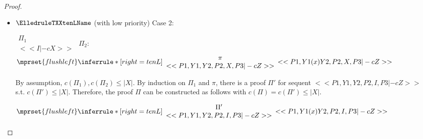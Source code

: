 \begin{proof}
\begin{enumerate}
\begin{itemize}
  \item $\ElledruleTXXtenLName$ (with low priority) Case 2:
      \begin{center}
        \scriptsize
        \begin{math}
          \begin{array}{c}
            \Pi_1 \\
            {<<I |-c X>>}
          \end{array}
        \end{math}
        \qquad\qquad
        $\Pi_2$:
        \begin{math}
          $$\mprset{flushleft}
          \inferrule* [right={\tiny tenL}] {
            {
              \begin{array}{c}
                \pi \\
                {<<P1, Y1, Y2, P2, X, P3 |-c Z>>}
              \end{array}
            }
          }{<<P1, Y1 (x) Y2, P2, X, P3 |-c Z>>}
        \end{math}
      \end{center}
      By assumption, $c(\Pi_1),c(\Pi_2)\leq |X|$. By induction on $\Pi_1$ and $\pi$, there is
      a proof $\Pi'$ for sequent $<<P1, Y1, Y2, P2, I, P3 |-c Z>>$ s.t. $c(\Pi') \leq |X|$.
      Therefore, the proof $\Pi$ can be constructed as follows with
      $c(\Pi) = c(\Pi') \leq |X|$.
      \begin{center}
        \scriptsize
        \begin{math}
          $$\mprset{flushleft}
          \inferrule* [right={\tiny tenL}] {
            {
              \begin{array}{c}
                \Pi' \\
                {<<P1, Y1, Y2, P2, I, P3 |-c Z>>}
              \end{array}
            }
          }{<<P1, Y1 (x) Y2, P2, I, P3 |-c Z>>}
        \end{math}
      \end{center}


\end{itemize}
\end{enumerate}
\end{proof}
